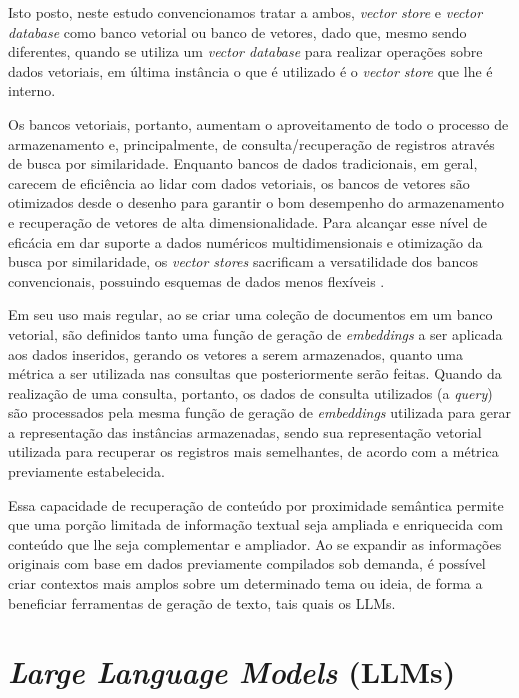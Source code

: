 Isto posto, neste estudo convencionamos tratar a ambos, \textit{vector store} e \textit{vector database} como banco vetorial ou banco de vetores, dado que, mesmo sendo diferentes, quando se utiliza um \textit{vector database} para realizar operações sobre dados vetoriais, em última instância o que é utilizado é o \textit{vector store} que lhe é interno.

Os bancos vetoriais, portanto, aumentam o aproveitamento de todo o processo de armazenamento e, principalmente, de consulta/recuperação de registros através de busca por similaridade. Enquanto bancos de dados tradicionais, em geral, carecem de eficiência ao lidar com dados vetoriais, os bancos de vetores são otimizados desde o desenho para garantir o bom desempenho do armazenamento e recuperação de vetores de alta dimensionalidade. Para alcançar esse nível de eficácia em dar suporte a dados numéricos multidimensionais e otimização da busca por similaridade, os \textit{vector stores} sacrificam a versatilidade dos bancos convencionais, possuindo esquemas de dados menos flexíveis \cite{Bancos-Vetoriais:3}.

Em seu uso mais regular, ao se criar uma coleção de documentos em um banco vetorial, são definidos tanto uma função de geração de \textit{embeddings} a ser aplicada aos dados inseridos, gerando os vetores a serem armazenados, quanto uma métrica a ser utilizada nas consultas que posteriormente serão feitas. Quando da realização de uma consulta, portanto, os dados de consulta utilizados (a \textit{query}) são processados pela mesma função de geração de \textit{embeddings} utilizada para gerar a representação das instâncias armazenadas, sendo sua representação vetorial utilizada para recuperar os registros mais semelhantes, de acordo com a métrica previamente estabelecida.

Essa capacidade de recuperação de conteúdo por proximidade semântica permite que uma porção limitada de informação textual seja ampliada e enriquecida com conteúdo que lhe seja complementar e ampliador. Ao se expandir as informações originais com base em dados previamente compilados sob demanda, é possível criar contextos mais amplos sobre um determinado tema ou ideia, de forma a beneficiar ferramentas de geração de texto, tais quais os \ac{LLM}s.

\section{\textit{Large Language Models} (LLMs)}
\label{sec:Teorico.5}

